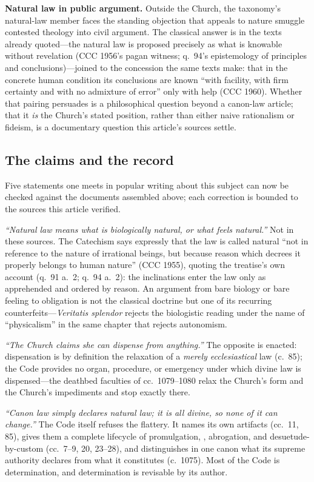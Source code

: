 \textbf{Natural law in public argument.} Outside the Church, the taxonomy's natural-law member faces the standing objection that appeals to nature smuggle contested theology into civil argument. The classical answer is in the texts already quoted---the natural law is proposed precisely as what is knowable without revelation (CCC 1956's pagan witness; q.~94's epistemology of principles and conclusions)---joined to the concession the same texts make: that in the concrete human condition its conclusions are known ``with facility, with firm certainty and with no admixture of error'' only with help (CCC 1960). Whether that pairing persuades is a philosophical question beyond a canon-law article; that it \emph{is} the Church's stated position, rather than either naive rationalism or fideism, is a documentary question this article's sources settle.

\subsection{The claims and the record}

Five statements one meets in popular writing about this subject can now be checked against the documents assembled above; each correction is bounded to the sources this article verified.

\emph{``Natural law means what is biologically natural, or what feels natural.''} Not in these sources. The Catechism says expressly that the law is called natural ``not in reference to the nature of irrational beings, but because reason which decrees it properly belongs to human nature'' (CCC 1955), quoting the treatise's own account (q.~91 a.~2; q.~94 a.~2): the inclinations enter the law only as apprehended and ordered by reason. An argument from bare biology or bare feeling to obligation is not the classical doctrine but one of its recurring counterfeits---\emph{Veritatis splendor} rejects the biologistic reading under the name of ``physicalism'' in the same chapter that rejects autonomism.

\emph{``The Church claims she can dispense from anything.''} The opposite is enacted: dispensation is by definition the relaxation of a \emph{merely ecclesiastical} law (c.~85); the Code provides no organ, procedure, or emergency under which divine law is dispensed---the deathbed faculties of cc.~1079--1080 relax the Church's form and the Church's impediments and stop exactly there.

\emph{``Canon law simply declares natural law; it is all divine, so none of it can change.''} The Code itself refuses the flattery. It names its own artifacts  (cc.~11, 85), gives them a complete lifecycle of promulgation, , abrogation, and desuetude-by-custom (cc.~7--9, 20, 23--28), and distinguishes in one canon what its supreme authority declares from what it constitutes (c.~1075). Most of the Code is determination, and determination is revisable by its author.

